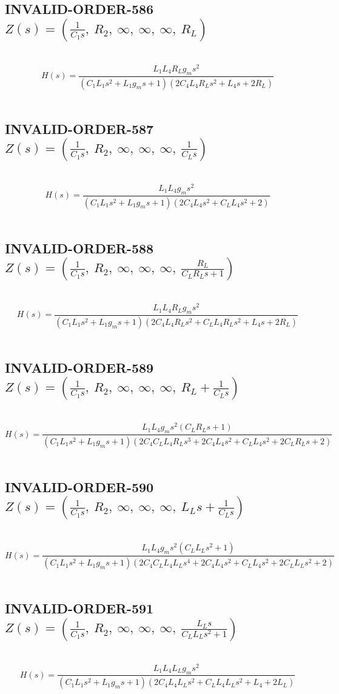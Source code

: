 \documentclass{article}
\begin{document}
\subsection{INVALID-ORDER-586 $Z(s) = \left( \frac{1}{C_{1} s}, \  R_{2}, \  \infty, \  \infty, \  \infty, \  R_{L}\right)$ } \ 
\textbf{\[H(s) = \frac{L_{1} L_{4} R_{L} g_{m} s^{2}}{\left(C_{1} L_{1} s^{2} + L_{1} g_{m} s + 1\right) \left(2 C_{4} L_{4} R_{L} s^{2} + L_{4} s + 2 R_{L}\right)}\] } \ 
\subsection{INVALID-ORDER-587 $Z(s) = \left( \frac{1}{C_{1} s}, \  R_{2}, \  \infty, \  \infty, \  \infty, \  \frac{1}{C_{L} s}\right)$ } \ 
\textbf{\[H(s) = \frac{L_{1} L_{4} g_{m} s^{2}}{\left(C_{1} L_{1} s^{2} + L_{1} g_{m} s + 1\right) \left(2 C_{4} L_{4} s^{2} + C_{L} L_{4} s^{2} + 2\right)}\] } \ 
\subsection{INVALID-ORDER-588 $Z(s) = \left( \frac{1}{C_{1} s}, \  R_{2}, \  \infty, \  \infty, \  \infty, \  \frac{R_{L}}{C_{L} R_{L} s + 1}\right)$ } \ 
\textbf{\[H(s) = \frac{L_{1} L_{4} R_{L} g_{m} s^{2}}{\left(C_{1} L_{1} s^{2} + L_{1} g_{m} s + 1\right) \left(2 C_{4} L_{4} R_{L} s^{2} + C_{L} L_{4} R_{L} s^{2} + L_{4} s + 2 R_{L}\right)}\] } \ 
\subsection{INVALID-ORDER-589 $Z(s) = \left( \frac{1}{C_{1} s}, \  R_{2}, \  \infty, \  \infty, \  \infty, \  R_{L} + \frac{1}{C_{L} s}\right)$ } \ 
\textbf{\[H(s) = \frac{L_{1} L_{4} g_{m} s^{2} \left(C_{L} R_{L} s + 1\right)}{\left(C_{1} L_{1} s^{2} + L_{1} g_{m} s + 1\right) \left(2 C_{4} C_{L} L_{4} R_{L} s^{3} + 2 C_{4} L_{4} s^{2} + C_{L} L_{4} s^{2} + 2 C_{L} R_{L} s + 2\right)}\] } \ 
\subsection{INVALID-ORDER-590 $Z(s) = \left( \frac{1}{C_{1} s}, \  R_{2}, \  \infty, \  \infty, \  \infty, \  L_{L} s + \frac{1}{C_{L} s}\right)$ } \ 
\textbf{\[H(s) = \frac{L_{1} L_{4} g_{m} s^{2} \left(C_{L} L_{L} s^{2} + 1\right)}{\left(C_{1} L_{1} s^{2} + L_{1} g_{m} s + 1\right) \left(2 C_{4} C_{L} L_{4} L_{L} s^{4} + 2 C_{4} L_{4} s^{2} + C_{L} L_{4} s^{2} + 2 C_{L} L_{L} s^{2} + 2\right)}\] } \ 
\subsection{INVALID-ORDER-591 $Z(s) = \left( \frac{1}{C_{1} s}, \  R_{2}, \  \infty, \  \infty, \  \infty, \  \frac{L_{L} s}{C_{L} L_{L} s^{2} + 1}\right)$ } \ 
\textbf{\[H(s) = \frac{L_{1} L_{4} L_{L} g_{m} s^{2}}{\left(C_{1} L_{1} s^{2} + L_{1} g_{m} s + 1\right) \left(2 C_{4} L_{4} L_{L} s^{2} + C_{L} L_{4} L_{L} s^{2} + L_{4} + 2 L_{L}\right)}\] } \ 
\end{document}

